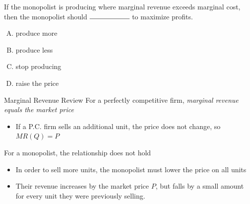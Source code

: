 \documentclass[11pt,t]{beamer}
\begin{document}
\begin{frame}{}
  If the monopolist is producing where marginal revenue exceeds marginal cost, then the monopolist should $\rule{2cm}{0.15mm}$ to maximize profits.

  \begin{enumerate}[A)]
    \item produce more
    \item produce less
    \item stop producing
    \item raise the price
  \end{enumerate}
\end{frame}

\begin{frame}{Marginal Revenue Review}
  For a perfectly competitive firm, \textit{marginal revenue equals the market price}

  \begin{itemize}
    \item If a P.C. firm sells an additional unit, the price does not change, so $MR(Q) = P$
  \end{itemize}

  \bigskip
  For a monopolist, the relationship does not hold

  \begin{itemize}
    \item In order to sell more units, the monopolist must lower the price on all units
    
    \item Their revenue increases by the market price $P$, but falls by a small amount for every unit they were previously selling.
  \end{itemize}
\end{frame}
\end{document}
